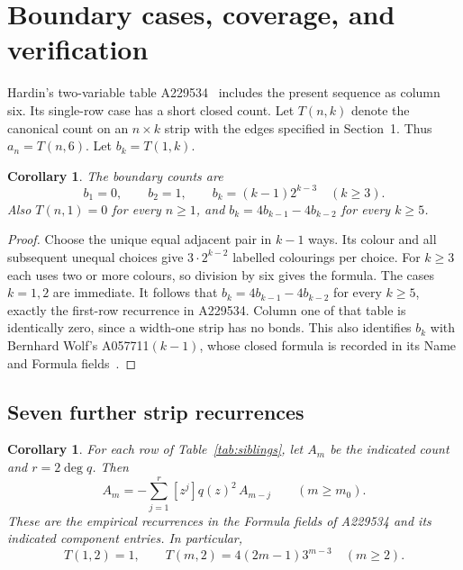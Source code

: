 \documentclass[11pt,a4paper]{article}
\newtheorem{corollary}[theorem]{Corollary}
\begin{document}
\section{Boundary cases, coverage, and verification}

Hardin's two-variable table A229534~\cite{family} includes the present
sequence as column six. Its single-row case has a short closed count.
Let $T(n,k)$ denote the canonical count on an $n\times k$ strip with the
edges specified in Section~1. Thus $a_n=T(n,6)$.
Let $b_k=T(1,k)$.
\begin{corollary}\label{cor:boundary}
The boundary counts are
\[
 b_1=0,\qquad b_2=1,\qquad
 b_k=(k-1)2^{k-3}\quad(k\geq3).
\]
Also $T(n,1)=0$ for every $n\geq1$, and
$b_k=4b_{k-1}-4b_{k-2}$ for every $k\geq5$.
\end{corollary}
\begin{proof}
Choose the unique equal adjacent pair in $k-1$ ways. Its colour
and all subsequent unequal choices give $3\cdot2^{k-2}$ labelled
colourings per choice. For $k\geq3$ each uses two or more colours,
so division by six gives the formula. The cases $k=1,2$ are immediate.
It follows that $b_k=4b_{k-1}-4b_{k-2}$ for every $k\geq5$, exactly
the first-row recurrence in A229534. Column one of that table is
identically zero, since a width-one strip has no bonds.
This also identifies $b_k$ with Bernhard Wolf's A057711$(k-1)$, whose
closed formula is recorded in its Name and Formula fields~\cite{boundary-sources}.
\end{proof}

\subsection{Seven further strip recurrences}

\begin{corollary}\label{cor:siblings}
For each row of Table~\ref{tab:siblings}, let $A_m$ be the indicated
count and $r=2\deg q$. Then
\begin{equation}\label{eq:sibling-recurrence}
 A_m=-\sum_{j=1}^r [z^j]q(z)^2\,A_{m-j}\qquad(m\geq m_0).
\end{equation}
These are the empirical recurrences in the Formula fields of A229534
and its indicated component entries. In particular,
\[
 T(1,2)=1,\qquad T(m,2)=4(2m-1)3^{m-3}\quad(m\geq2).
\]
\end{corollary}
\end{document}
